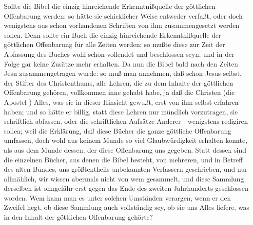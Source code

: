 \begin{aufza}
\begin{aufzb}
\item Sollte die Bibel die einzig hinreichende Erkenntnißquelle der göttlichen Offenbarung werden: so hätte sie schicklicher Weise  entweder verfaßt, oder doch wenigstens aus schon vorhandenen Schriften von ihm zusammengesetzt werden sollen. Denn sollte ein Buch die einzig hinreichende Erkenntnißquelle der göttlichen Offenbarung für alle Zeiten werden: so mußte diese zur Zeit der Abfassung des Buches wohl schon vollendet und beschlossen seyn, und in der Folge gar keine Zusätze mehr erhalten. Da nun die Bibel bald nach den Zeiten Jesu zusammengetragen wurde: so muß man annehmen, daß schon Jesus selbst, der Stifter des Christenthums, alle Lehren, die zu dem Inhalte der göttlichen Offenbarung gehören, vollkommen inne gehabt habe, ja daß die Christen (die Apostel \uA ) Alles, was sie in dieser Hinsicht gewußt, erst von ihm selbst erfahren haben; und so hätte er billig, statt diese Lehren nur mündlich vorzutragen, sie schriftlich abfassen, oder die schriftlichen Aufsätze Anderer~\ wenigstens redigiren sollen; weil die Erklärung, daß diese Bücher die ganze göttliche Offenbarung umfassen, doch wohl aus keinem Munde so viel Glaubwürdigkeit erhalten konnte, als aus dem Munde dessen, der diese Offenbarung uns gegeben. Statt dessen sind die einzelnen Bücher, aus denen die Bibel besteht, von mehreren, und in Betreff des alten Bundes, uns größtentheils unbekannten Verfassern geschrieben, und nur allmählich, wir wissen abermals nicht von wem gesammelt, und diese Sammlung derselben ist ohngefähr erst gegen das Ende des zweiten Jahrhunderts geschlossen worden. Wem kann man es unter solchen Umständen verargen, wenn er den Zweifel hegt, ob diese Sammlung auch vollständig sey, ob sie uns Alles liefere, was in den Inhalt der göttlichen Offenbarung gehörte?

\end{aufzb}
\end{aufza}
